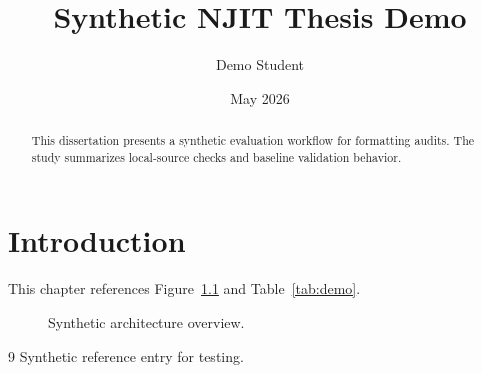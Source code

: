 \documentclass[12pt]{report}
\title{Synthetic NJIT Thesis Demo}
\author{Demo Student}
\date{May 2026}
\begin{document}
\maketitle

\begin{abstract}
This dissertation presents a synthetic evaluation workflow for formatting audits.
The study summarizes local-source checks and baseline validation behavior.
\end{abstract}

\tableofcontents
\listoftables
\listoffigures

\chapter{Introduction}
This chapter references Figure~\ref{fig:demo} and Table~\ref{tab:demo}.

\begin{figure}[h]
\centering
\caption{Synthetic architecture overview.}
\label{fig:demo}
\end{figure}

\begin{table}[h]
\centering
\caption{Synthetic evaluation results.}
\label{tab:demo}
\end{table}

\begin{thebibliography}{9}
 Synthetic reference entry for testing.
\end{thebibliography}
\end{document}
